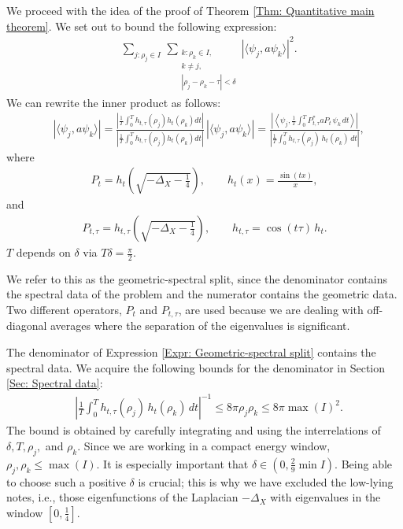 \documentclass[11pt,twoside,reqno]{amsart} \usepackage{a4wide} \usepackage[T1]{fontenc} \usepackage[utf8]{inputenc} \usepackage{soul}  \usepackage{amsmath} \usepackage{amsfonts} \usepackage{amssymb} \usepackage{mathtools} \usepackage{amsthm} \usepackage{xcolor} \usepackage{graphicx} \usepackage{hyperref} \usepackage{standalone} \usepackage{esint} \usepackage{comment} \usepackage[left=2.3cm,top=3cm,right=2.3cm]{geometry} \usepackage{bm} \usepackage{svg} \usepackage{float} \numberwithin{equation}{section} \theoremstyle{plain} \newtheorem{thm}{Theorem}[section] \newtheorem{theorem}[thm]{Theorem} \newtheorem*{theorem*}{Theorem}\newtheorem{conj}[thm]{Conjecture} \newtheorem{lemma}[thm]{Lemma} \newtheorem{prop}[thm]{Proposition} \newtheorem{proposition}[thm]{Proposition} \newtheorem{cor}[thm]{Corollary} \newtheorem{question}[thm]{Question} \newtheorem{corollary}[thm]{Corollary} \newtheorem{assumption}[thm]{Assumption} \theoremstyle{definition} \newtheorem{defn}[thm]{Definition} \newtheorem{choice}[thm]{Choice} \newtheorem{definition}[thm]{Definition} \newtheorem{ex}[thm]{Example} \newtheorem{notation}[thm]{Notation} \newtheorem*{ack}{Acknowledgements} \theoremstyle{remark} \newtheorem{remark}[thm]{Remark} \newtheorem{bigremark}[thm]{Remark} \usepackage{xcolor} \newcommand{\red}[1]{ {\color{Red}#1} } \newcommand{\blue}[1]{ {\color{Blue}#1} } \author{Kai Hippi} \address{Aalto University, Espoo, Finland} \email{kai.hippi@aalto.fi}
\begin{document}
We proceed with the idea of the proof of Theorem \ref{Thm: Quantitative main theorem}. We set out to bound the following expression:
\begin{align}
	&
	\label{Expr: Double sum}
	\sum_{j: \rho_{j} \in I}^{} \, \sum_{ \substack{ k: \rho_{k} \in I, \\ k \neq j, \\ | \rho_{j} - \rho_{k} - \tau | < \delta } }^{} \left| \langle \psi_{j}, a \psi_{k} \rangle \right|^{2}.
\end{align}
We can rewrite the inner product as follows:
\begin{align}
	&
	\label{Expr: Geometric-spectral split}
	| \langle \psi_{j}, a \psi_{k} \rangle | = \frac{ \left| \frac{1}{T} \int_{0}^{T} h_{t,\tau}( \rho_{j}  ) h_{t}( \rho_{k} ) dt \right| }{ \left| \frac{1}{T} \int_{0}^{T} h_{t,\tau}( \rho_{j}  ) h_{t}( \rho_{k} ) dt \right| } \, | \langle \psi_{j}, a \psi_{k} \rangle | = \frac{ \left| \left \langle \psi_{j} , \frac{1}{T} \int_{0}^{T} P_{t,\tau}^{*} a P_{t} \, \psi_{k} \, dt \right \rangle \right| }{ \left| \frac{1}{T} \int_{0}^{T} h_{t, \tau}( \rho_{j} ) \, h_{t}( \rho_{k} ) \, d t \right| },
\end{align}
where 
\begin{align*}
	P_{t} = h_{t}\left( \sqrt{ -\Delta_{X} - \frac{1}{4} } \right), \qquad h_{t}( x ) = \frac{\sin( tx )}{x},
\end{align*}
and
\begin{align*}
	P_{t,\tau} = h_{t,\tau}\left( \sqrt{ -\Delta_{X} - \frac{1}{4} } \right), \qquad h_{t,\tau} = \cos( t \tau ) \, h_{t}.
\end{align*}
$ T $ depends on $ \delta $ via $T \delta = \tfrac{\pi}{2}$.

We refer to this as the geometric-spectral split, since the denominator contains the spectral data of the problem and the numerator contains the geometric data. Two different operators, $ P_{t} $ and $ P_{t,\tau} $, are used because we are dealing with off-diagonal averages where the separation of the eigenvalues is significant. 

The denominator of Expression \eqref{Expr: Geometric-spectral split} contains the spectral data. We acquire the following bounds for the denominator in Section \ref{Sec: Spectral data}:
\begin{align*}
	&
	\left| \frac{1}{T} \int_{0}^{T} h_{t, \tau}( \rho_{j} ) \, h_{t}( \rho_{k} ) \, d t \right|^{-1} \leq 8 \pi \rho_{j} \rho_{k} \leq 8 \pi \max( I )^{2}.
\end{align*}
The bound is obtained by carefully integrating and using the interrelations of $ \delta, T, \rho_{j}, $ and $ \rho_{k} $. Since we are working in a compact energy window, $ \rho_{j}, \rho_{k} \leq \max( I ) $. It is especially important that $ \delta \in (0 , \tfrac{2}{9} \min I) $. Being able to choose such a positive $ \delta $ is crucial; this is why we have excluded the low-lying notes, i.e., those eigenfunctions of the Laplacian $ -\Delta_{X} $ with eigenvalues in the window $ [0, \tfrac{1}{4}] $.
\end{document}
